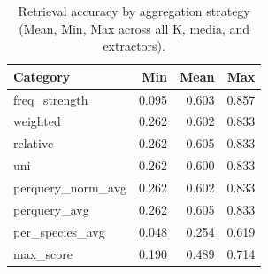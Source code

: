 \begin{table}[ht]
\centering
\caption{Retrieval accuracy by aggregation strategy (Mean, Min, Max across all K, media, and extractors).}
\label{tab:by_agg}
\small
\begin{tabular}{@{}lrrr@{}}
\toprule
Category & Min & Mean & Max \\
\midrule
freq\_strength & 0.095 & 0.603 & 0.857 \\
weighted & 0.262 & 0.602 & 0.833 \\
relative & 0.262 & 0.605 & 0.833 \\
uni & 0.262 & 0.600 & 0.833 \\
perquery\_norm\_avg & 0.262 & 0.602 & 0.833 \\
perquery\_avg & 0.262 & 0.605 & 0.833 \\
per\_species\_avg & 0.048 & 0.254 & 0.619 \\
max\_score & 0.190 & 0.489 & 0.714 \\
\bottomrule
\end{tabular}
\end{table}
